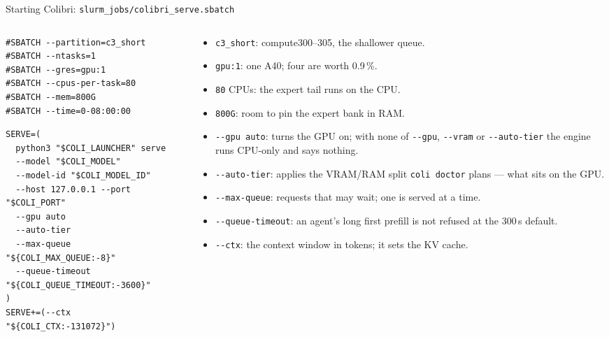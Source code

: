 \documentclass[aspectratio=169]{beamer}
\begin{document}
\begin{frame}[fragile]{Starting Colibri: \texttt{slurm\_jobs/colibri\_serve.sbatch}}

\begin{columns}[T]
\begin{column}{0.47\textwidth}
\begin{lstlisting}
#SBATCH --partition=c3_short
#SBATCH --ntasks=1
#SBATCH --gres=gpu:1
#SBATCH --cpus-per-task=80
#SBATCH --mem=800G
#SBATCH --time=0-08:00:00
\end{lstlisting}
\begin{lstlisting}
SERVE=(
  python3 "$COLI_LAUNCHER" serve
  --model "$COLI_MODEL"
  --model-id "$COLI_MODEL_ID"
  --host 127.0.0.1 --port "$COLI_PORT"
  --gpu auto
  --auto-tier
  --max-queue "${COLI_MAX_QUEUE:-8}"
  --queue-timeout "${COLI_QUEUE_TIMEOUT:-3600}"
)
SERVE+=(--ctx "${COLI_CTX:-131072}")
\end{lstlisting}
\end{column}
\begin{column}{0.51\textwidth}
\scriptsize
\begin{itemize}\setlength{\itemsep}{0.15em}
\item \texttt{c3\_short}: compute300--305, the shallower queue.
\item \texttt{gpu:1}: one A40; four are worth 0.9\,\%.
\item \texttt{80} CPUs: the expert tail runs on the CPU.
\item \texttt{800G}: room to pin the expert bank in RAM.
\item \texttt{-{}-gpu auto}: turns the GPU on; with none of \texttt{-{}-gpu}, \texttt{-{}-vram} or \texttt{-{}-auto-tier} the engine runs CPU-only and says nothing.
\item \texttt{-{}-auto-tier}: applies the VRAM/RAM split \texttt{coli doctor} plans --- what sits on the GPU.
\item \texttt{-{}-max-queue}: requests that may wait; one is served at a time.
\item \texttt{-{}-queue-timeout}: an agent's long first prefill is not refused at the 300\,s default.
\item \texttt{-{}-ctx}: the context window in tokens; it sets the KV cache.
\end{itemize}
\end{column}
\end{columns}

\end{frame}
\end{document}
